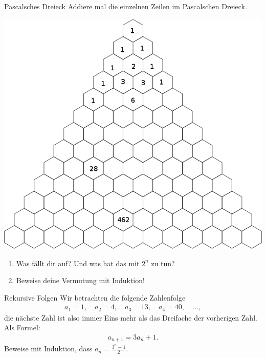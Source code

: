 \documentclass{../zirkelblatt1415}
\begin{document}
\newpage

\begin{aufgabe}{Pascalsches Dreieck}
Addiere mal die einzelnen Zeilen im Pascalschen Dreieck.
\begin{center}
\includegraphics[scale=0.8]{pascal-triangle-tipps}
\end{center}
\begin{enumerate}
\item Was f\"allt dir auf? Und was hat das mit $2^n$ zu tun?
\item Beweise deine Vermutung mit Induktion!
\end{enumerate}\fixlistspacing
\end{aufgabe}

\begin{aufgabe}{Rekursive Folgen}
Wir betrachten die folgende Zahlenfolge
\begin{align*}
a_1 = 1, \quad a_2 = 4, \quad a_3 = 13, \quad a_4 = 40, \quad \ldots,
\end{align*}
die n\"achste Zahl ist also immer Eins mehr als das Dreifache der vorherigen
Zahl. Als Formel:
\begin{align*}
 a_{n+1} = 3 a_n + 1.
\end{align*}
Beweise mit Induktion, dass $a_n = \frac{3^n - 1}{2}$.
\end{aufgabe}
\end{document}
